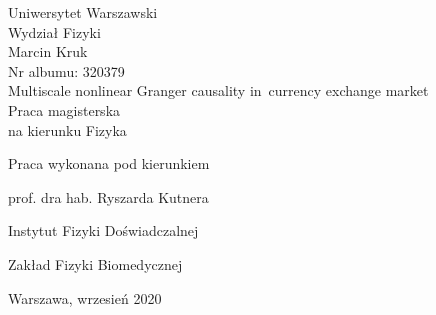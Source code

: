 \thispagestyle{empty}
\vspace*{2cm}
\begin{center}
{\huge Uniwersytet Warszawski\\ \vspace{0.3cm}
Wydział Fizyki}\\
\vspace{1.5cm}
Marcin Kruk\\
Nr albumu: 320379\\
\vspace{1.5cm}
{\huge Multiscale nonlinear Granger causality \mbox{in currency} exchange market}\\
\vspace{2cm}
Praca magisterska\\
na kierunku Fizyka
\end{center}
\vspace{3cm}
\hfill Praca wykonana pod kierunkiem \vspace{0.2cm}

\hfill prof. dra hab. Ryszarda Kutnera

\hfill Instytut Fizyki Doświadczalnej

\hfill Zakład Fizyki Biomedycznej
\vfill
\begin{center}
{\large Warszawa, wrzesień 2020}\\
\end{center}
